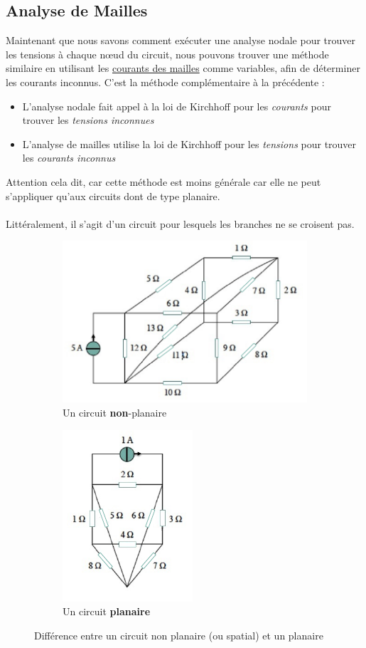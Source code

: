 \documentclass[12pt,a4paper]{article}
\begin{document}
\subsection{Analyse de Mailles}
Maintenant que nous savons comment exécuter une analyse nodale pour trouver les tensions à chaque n\oe ud du circuit, nous pouvons trouver une méthode similaire en utilisant les \uline{courants des mailles} comme variables, afin de déterminer les courants inconnus. C'est la méthode complémentaire à la précédente : 
\begin{itemize}
	\item 	L'analyse nodale fait appel à la loi de Kirchhoff pour les \textit{courants} pour trouver les \textit{tensions inconnues}
	\item 	L'analyse de mailles utilise la loi de Kirchhoff pour les \textit{tensions} pour trouver les \textit{courants inconnus}
\end{itemize}
Attention cela dit, car cette méthode est moins générale car elle ne peut s'appliquer qu'aux circuits dont de type planaire.\\
\\
 Littéralement, il s'agit d'un circuit pour lesquels les branches ne se croisent pas.
\begin{figure}[!h]
	\centering
	\begin{subfigure}[b]{0.45\textwidth}
		\centering
		\includegraphics[scale=0.7]{images/non_planaire}
		\caption{Un circuit \textbf{non}-planaire}
		\label{subfig: non-planaire}
	\end{subfigure}
	\begin{subfigure}[b]{0.45\textwidth}
		\centering
		\includegraphics[scale=0.75]{images/planaire}
		\caption{Un circuit \textbf{planaire}}
		\label{subfig: planaire}
	\end{subfigure}
	\caption{Différence entre un circuit non planaire (ou spatial) et un planaire }
\end{figure}
\end{document}
